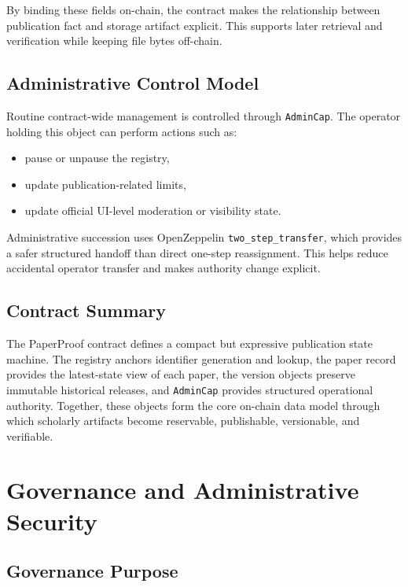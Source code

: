 \documentclass[journal]{IEEEtran}
\begin{document}
By binding these fields on-chain, the contract makes the relationship between publication fact and storage artifact explicit. This supports later retrieval and verification while keeping file bytes off-chain.

\subsection{Administrative Control Model}

Routine contract-wide management is controlled through \texttt{AdminCap}. The operator holding this object can perform actions such as:
\begin{itemize}
    \item pause or unpause the registry,
    \item update publication-related limits,
    \item update official UI-level moderation or visibility state.
\end{itemize}


Administrative succession uses OpenZeppelin \texttt{two\_step\_transfer}, which provides a safer structured handoff than direct one-step reassignment. This helps reduce accidental operator transfer and makes authority change explicit.

\subsection{Contract Summary}

The PaperProof contract defines a compact but expressive publication state machine. The registry anchors identifier generation and lookup, the paper record provides the latest-state view of each paper, the version objects preserve immutable historical releases, and \texttt{AdminCap} provides structured operational authority. Together, these objects form the core on-chain data model through which scholarly artifacts become reservable, publishable, versionable, and verifiable.



\section{Governance and Administrative Security}

\subsection{Governance Purpose}
\end{document}
